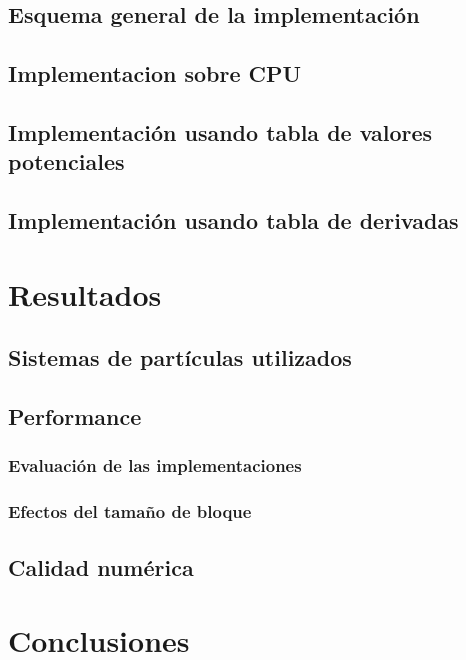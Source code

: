 \documentclass[a4paper,10pt]{report}
\begin{document}
\section{Esquema general de la implementación}
\section{Implementacion sobre CPU}
\section{Implementación usando tabla de valores potenciales}
\section{Implementación usando tabla de derivadas}













\chapter{Resultados}
\section{Sistemas de partículas utilizados}
\section{Performance}
\subsection{Evaluación de las implementaciones}
\subsection{Efectos del tamaño de bloque}
\section{Calidad numérica}














\chapter{Conclusiones}
\end{document}
